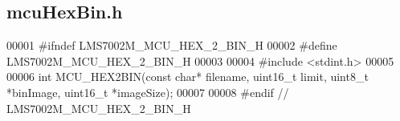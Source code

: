\subsection{mcu\+Hex\+Bin.\+h}
\label{mcuHexBin_8h_source}

\begin{DoxyCode}
00001 \textcolor{preprocessor}{#ifndef LMS7002M\_MCU\_HEX\_2\_BIN\_H}
00002 \textcolor{preprocessor}{#define LMS7002M\_MCU\_HEX\_2\_BIN\_H}
00003 
00004 \textcolor{preprocessor}{#include <stdint.h>}
00005 
00006 \textcolor{keywordtype}{int} MCU_HEX2BIN(\textcolor{keyword}{const} \textcolor{keywordtype}{char}* filename, uint16\_t limit, uint8\_t *binImage, uint16\_t *imageSize);
00007 
00008 \textcolor{preprocessor}{#endif // LMS7002M\_MCU\_HEX\_2\_BIN\_H}
\end{DoxyCode}
